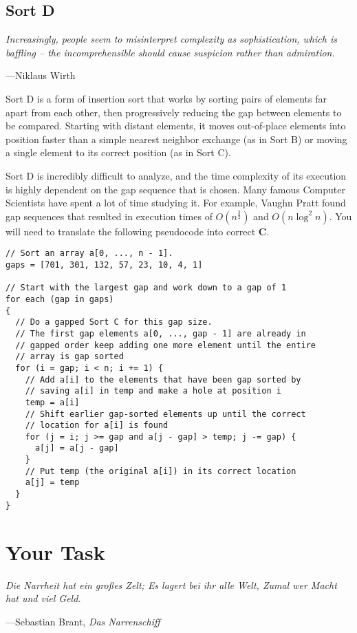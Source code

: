 \documentclass{article}
\begin{document}
\subsection{Sort D}
\epigraph{\emph{Increasingly, people seem to misinterpret complexity as
sophistication, which is baffling -- the incomprehensible should cause
suspicion rather than admiration.}}{---Niklaus Wirth}

\noindent Sort D is a form of insertion sort that works
by sorting pairs of elements far apart from each other, then progressively
reducing the gap between elements to be compared. Starting with distant
elements, it moves out-of-place elements into position faster than a
simple nearest neighbor exchange (as in Sort B) or moving a single
element to its correct position (as in Sort C).

Sort D is incredibly difficult to analyze, and the time complexity of its
execution is highly dependent on the gap sequence that is chosen. Many famous
Computer Scientists have spent a lot of time studying it.
For example, Vaughn Pratt found gap sequences that resulted in execution
times of
$O(n^\frac{3}{2})$ and $O(n \log^2 n)$.
You will need to translate the following pseudocode into correct \textbf{C}.

\begin{lstlisting}[title=Sort D (pseudocode)]
// Sort an array a[0, ..., n - 1].
gaps = [701, 301, 132, 57, 23, 10, 4, 1]

// Start with the largest gap and work down to a gap of 1
for each (gap in gaps)
{
  // Do a gapped Sort C for this gap size.
  // The first gap elements a[0, ..., gap - 1] are already in
  // gapped order keep adding one more element until the entire
  // array is gap sorted
  for (i = gap; i < n; i += 1) {
    // Add a[i] to the elements that have been gap sorted by
    // saving a[i] in temp and make a hole at position i
    temp = a[i]
    // Shift earlier gap-sorted elements up until the correct
    // location for a[i] is found
    for (j = i; j >= gap and a[j - gap] > temp; j -= gap) {
      a[j] = a[j - gap]
    }
    // Put temp (the original a[i]) in its correct location
    a[j] = temp
  }
}
\end{lstlisting}



\section{Your Task}
\epigraph{\emph{Die Narrheit hat ein gro\ss{}es Zelt;
Es lagert bei ihr alle Welt,
Zumal wer Macht hat und viel Geld.}}{---Sebastian Brant, \emph{Das Narrenschiff}}
\end{document}
